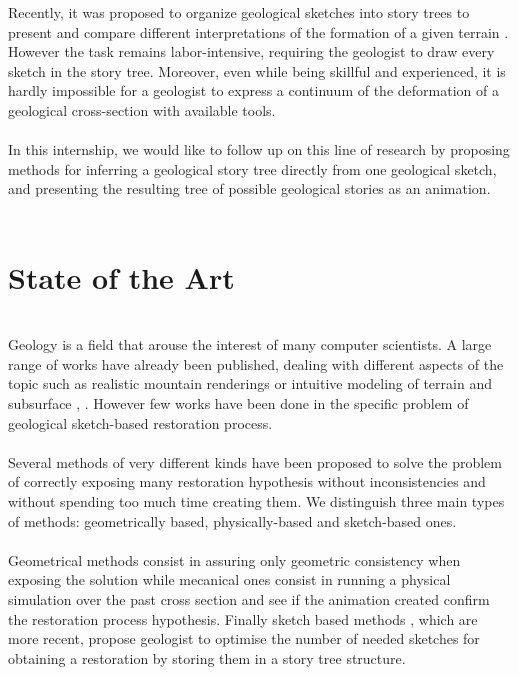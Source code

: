 \documentclass[12pt, a4paper]{report} %
\begin{document}
Recently, it was proposed to organize geological sketches into story trees to present and compare different interpretations of the formation of a given terrain \cite{lidal}. However the task remains labor-intensive, requiring the geologist to draw every sketch in the story tree. Moreover, even while being skillful and experienced, it is hardly impossible for a geologist to express a continuum of the deformation of a geological cross-section with available tools.\\\\
In this internship, we would like to follow up on this line of research by proposing methods for inferring a geological story tree directly from one geological sketch, and presenting the resulting tree of possible geological stories as an animation.\\\\

\chapter{State of the Art}\\

Geology is a field that arouse the interest of many computer scientists. A large range of works have already been published, dealing with different aspects of the topic such as realistic mountain renderings \cite{guillaume} or intuitive modeling of terrain and subsurface \cite{star}, \cite{compGeo}.
However few works have been done in the specific problem of geological sketch-based restoration process.\\\\
Several methods of very different kinds have been proposed to solve the problem of correctly exposing many restoration hypothesis without inconsistencies and without spending too much time creating them. We distinguish three main types of methods: geometrically based, physically-based and sketch-based ones.\\\\
Geometrical methods consist in assuring only geometric consistency when exposing the solution while mecanical ones consist in running a physical simulation over the past cross section and see if the animation created confirm the restoration process hypothesis. Finally sketch based methods , which are more recent, propose geologist to optimise the number of needed sketches for obtaining a restoration by storing them in a story tree structure.\\\\
\end{document}
